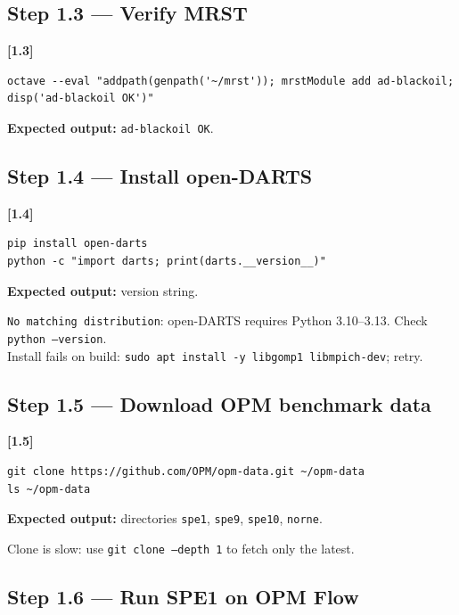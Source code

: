 \documentclass[10pt,a4paper]{article}
\newcommand{\stepID}[1]{\textsf{\textbf{[#1]}}}
\newcommand{\cmd}[1]{\texttt{#1}}
\begin{document}
\subsection{Step 1.3 --- Verify MRST}

\stepID{1.3}
\begin{lstlisting}[style=matlab]
octave --eval "addpath(genpath('~/mrst')); mrstModule add ad-blackoil; disp('ad-blackoil OK')"
\end{lstlisting}

\textbf{Expected output:} \cmd{ad-blackoil OK}.

\subsection{Step 1.4 --- Install open-DARTS}

\stepID{1.4}
\begin{lstlisting}[style=sh]
pip install open-darts
python -c "import darts; print(darts.__version__)"
\end{lstlisting}

\textbf{Expected output:} version string.

\begin{failure}
\texttt{No matching distribution}: open-DARTS requires Python 3.10--3.13. Check \cmd{python --version}.\\
Install fails on build: \cmd{sudo apt install -y libgomp1 libmpich-dev}; retry.
\end{failure}

\subsection{Step 1.5 --- Download OPM benchmark data}

\stepID{1.5}
\begin{lstlisting}[style=sh]
git clone https://github.com/OPM/opm-data.git ~/opm-data
ls ~/opm-data
\end{lstlisting}

\textbf{Expected output:} directories \cmd{spe1}, \cmd{spe9}, \cmd{spe10}, \cmd{norne}.

\begin{failure}
Clone is slow: use \cmd{git clone --depth 1} to fetch only the latest.
\end{failure}

\subsection{Step 1.6 --- Run SPE1 on OPM Flow}
\end{document}
